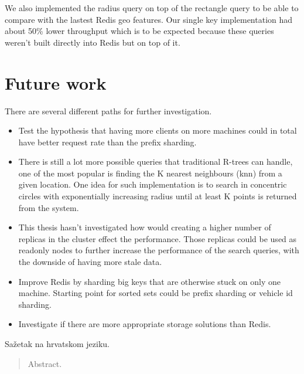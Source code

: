 \documentclass[times, utf8, diplomski]{fer}
\begin{document}
We also implemented the radius query on top of the rectangle query to be able to compare with the lastest Redis geo features. Our single key implementation had about 50\% lower throughput which is to be expected because these queries weren't built directly into Redis but on top of it.

\section {Future work}
There are several different paths for further investigation.
\begin{itemize}
\item Test the hypothesis that having more clients on more machines could in total have better request rate than the prefix sharding.

\item There is still a lot more possible queries that traditional R-trees can handle, one of the most popular is finding the K nearest neighbours (knn) from a given location. One idea for such implementation is to search in concentric circles with exponentially increasing radius until at least K points is returned from the system.

\item This thesis hasn't investigated how would creating a higher number of replicas in the cluster effect the performance. Those replicas could be used as readonly nodes to further increase the performance of the search queries, with the downside of having more stale data.

\item Improve Redis by sharding big keys that are otherwise stuck on only one machine. Starting point for sorted sets could be prefix sharding or vehicle id sharding.

\item Investigate if there are more appropriate storage solutions than Redis.
\end{itemize}





















\begin{sazetak}
Sažetak na hrvatskom jeziku.

\end{sazetak}

\begin{abstract}
Abstract.

\end{abstract}
\end{document}
